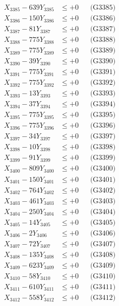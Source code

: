\documentclass[a4paper,10pt]{article}
\begin{document}
{\begin{align}
X_{3385} - 639Y_{3385} &\leq +0 && \text{(G3385)} \\
X_{3386} - 150Y_{3386} &\leq +0 && \text{(G3386)} \\
X_{3387} - 81Y_{3387} &\leq +0 && \text{(G3387)} \\
X_{3388} - 775Y_{3388} &\leq +0 && \text{(G3388)} \\
X_{3389} - 775Y_{3389} &\leq +0 && \text{(G3389)} \\
X_{3390} - 39Y_{3390} &\leq +0 && \text{(G3390)} \\
\allowbreak
X_{3391} - 775Y_{3391} &\leq +0 && \text{(G3391)} \\
X_{3392} - 775Y_{3392} &\leq +0 && \text{(G3392)} \\
X_{3393} - 13Y_{3393} &\leq +0 && \text{(G3393)} \\
X_{3394} - 37Y_{3394} &\leq +0 && \text{(G3394)} \\
X_{3395} - 775Y_{3395} &\leq +0 && \text{(G3395)} \\
X_{3396} - 775Y_{3396} &\leq +0 && \text{(G3396)} \\
X_{3397} - 34Y_{3397} &\leq +0 && \text{(G3397)} \\
X_{3398} - 10Y_{3398} &\leq +0 && \text{(G3398)} \\
X_{3399} - 91Y_{3399} &\leq +0 && \text{(G3399)} \\
X_{3400} - 809Y_{3400} &\leq +0 && \text{(G3400)} \\
\allowbreak
X_{3401} - 150Y_{3401} &\leq +0 && \text{(G3401)} \\
X_{3402} - 764Y_{3402} &\leq +0 && \text{(G3402)} \\
X_{3403} - 461Y_{3403} &\leq +0 && \text{(G3403)} \\
X_{3404} - 250Y_{3404} &\leq +0 && \text{(G3404)} \\
X_{3405} - 14Y_{3405} &\leq +0 && \text{(G3405)} \\
X_{3406} - 2Y_{3406} &\leq +0 && \text{(G3406)} \\
X_{3407} - 72Y_{3407} &\leq +0 && \text{(G3407)} \\
X_{3408} - 135Y_{3408} &\leq +0 && \text{(G3408)} \\
X_{3409} - 623Y_{3409} &\leq +0 && \text{(G3409)} \\
X_{3410} - 58Y_{3410} &\leq +0 && \text{(G3410)} \\
\allowbreak
X_{3411} - 610Y_{3411} &\leq +0 && \text{(G3411)} \\
X_{3412} - 558Y_{3412} &\leq +0 && \text{(G3412)} \\

\end{align}}
\end{document}
